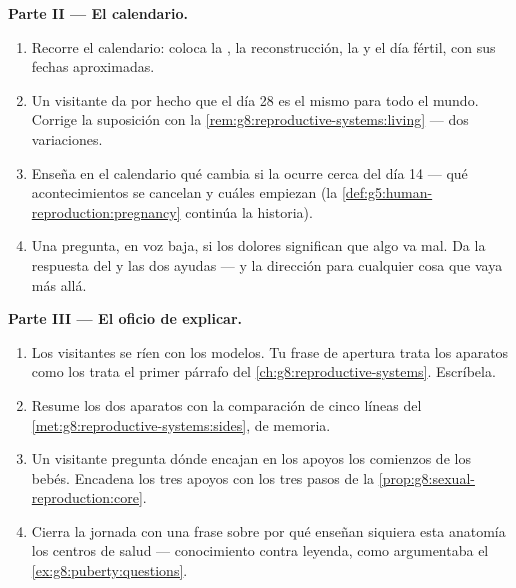 \begin{problem}
\medskip\noindent\textbf{Parte II --- El calendario.}
\begin{enumerate}[resume]
  \item Recorre el calendario: coloca la , la
        reconstrucción, la  y el día fértil, con sus fechas
        aproximadas.
  \item Un visitante da por hecho que el día 28 es el mismo para todo
        el mundo. Corrige la suposición con la
        \cref{rem:g8:reproductive-systems:living} --- dos variaciones.
  \item Enseña en el calendario qué cambia si la  ocurre
        cerca del día 14 --- qué acontecimientos se cancelan y cuáles
        empiezan (la \cref{def:g5:human-reproduction:pregnancy}
        continúa la historia).
  \item Una  pregunta, en voz baja, si los dolores
        significan que algo va mal. Da la respuesta del  y las
        dos ayudas --- y la dirección para cualquier cosa que vaya más
        allá.
\end{enumerate}

\medskip\noindent\textbf{Parte III --- El oficio de explicar.}
\begin{enumerate}[resume]
  \item Los visitantes se ríen con los modelos. Tu frase de apertura
        trata los aparatos como los trata el primer párrafo del
        \cref{ch:g8:reproductive-systems}. Escríbela.
  \item Resume los dos aparatos con la comparación de cinco líneas del
        \cref{met:g8:reproductive-systems:sides}, de memoria.
  \item Un visitante pregunta dónde encajan en los apoyos los comienzos
        de los bebés. Encadena los tres apoyos con los tres pasos de la
        \cref{prop:g8:sexual-reproduction:core}.
  \item Cierra la jornada con una frase sobre por qué enseñan siquiera
        esta anatomía los centros de salud --- conocimiento contra
        leyenda, como argumentaba el \cref{ex:g8:puberty:questions}.
\end{enumerate}
\end{problem}
